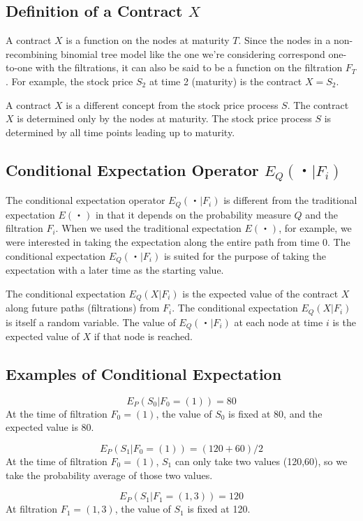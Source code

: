 \documentclass[uplatex,a4j,12pt,dvipdfmx]{jsarticle}
\begin{document}
\subsection{Definition of a Contract $X$}
A contract $X$ is a function on the nodes at maturity $T$. Since the nodes in a non-recombining binomial tree model like the one we're considering correspond one-to-one with the filtrations, it can also be said to be a function on the filtration $F_T$. For example, the stock price $S_2$ at time 2 (maturity) is the contract $X=S_2$.

A contract $X$ is a different concept from the stock price process $S$. The contract $X$ is determined only by the nodes at maturity. The stock price process $S$ is determined by all time points leading up to maturity.

\subsection{Conditional Expectation Operator $E_Q(・|F_i)$}
The conditional expectation operator $E_Q(・|F_i)$ is different from the traditional expectation $E(・)$ in that it depends on the probability measure $Q$ and the filtration $F_i$. When we used the traditional expectation $E(・)$, for example, we were interested in taking the expectation along the entire path from time 0. The conditional expectation $E_Q(・|F_i)$ is suited for the purpose of taking the expectation with a later time as the starting value.

The conditional expectation $E_Q(X|F_i)$ is the expected value of the contract $X$ along future paths (filtrations) from $F_i$. The conditional expectation $E_Q(X|F_i)$ is itself a random variable. The value of $E_Q(・|F_i)$ at each node at time $i$ is the expected value of $X$ if that node is reached.

\subsection{Examples of Conditional Expectation}

\[E_P( S_0 | F_0=(1) ) = 80\]
At the time of filtration $F_0=(1)$, the value of $S_0$ is fixed at 80, and the expected value is 80.

\[E_P( S_1 | F_0=(1) ) = (120+60)/2\]
At the time of filtration $F_0 = (1)$, $S_1$ can only take two values (120,60), so we take the probability average of those two values.

\[E_P( S_1 | F_1=(1,3) ) = 120\]
At filtration $F_1 = (1,3)$, the value of $S_1$ is fixed at 120.
\end{document}
